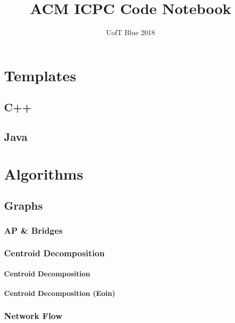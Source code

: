 \documentclass[twocolumn, landscape]{report}
\begin{document}
    \title{ACM ICPC Code Notebook}
    \author{UofT Blue 2018}
    \maketitle
    \tableofcontents
    \chapter*{Templates}
        \section{C++}
        
        \newpage
        \section{Java}
        

    \chapter*{Algorithms}
        \section{Graphs}
            \subsection{AP \& Bridges}
            
            \subsection{Centroid Decomposition}
                \subsubsection{Centroid Decomposition}
                
                \subsubsection{Centroid Decomposition (Eoin)}
                
            \subsection{Network Flow}
\end{document}

